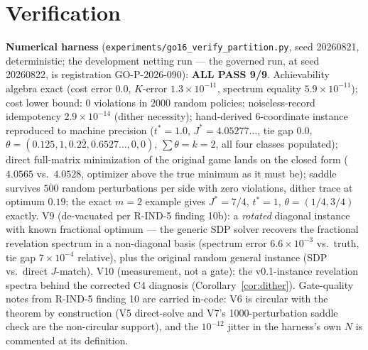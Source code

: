 \documentclass[11pt]{article}
\theoremstyle{definition}
\begin{document}
\section{Verification}

\textbf{Numerical harness}
(\texttt{experiments/go16\_verify\_partition.py}, seed 20260821,
deterministic; the development netting run --- the governed run, at
seed 20260822, is registration GO-P-2026-090): \textbf{ALL PASS 9/9}. Achievability algebra exact (cost
error $0.0$, $K$-error $1.3\times10^{-11}$, spectrum equality
$5.9\times10^{-11}$); cost lower bound: $0$ violations in $2000$
random policies; noiseless-record idempotency $2.9\times10^{-14}$
(dither necessity); hand-derived $6$-coordinate instance reproduced
to machine precision ($t^\ast = 1.0$, $J^\ast = 4.05277\ldots$,
tie gap $0.0$, $\theta = (0.125, 1, 0.2\overline{2}, 0.6527\ldots,
0, 0)$, $\sum\theta = k = 2$, all four classes populated); direct
full-matrix minimization of the original game lands on the closed
form ($4.0565$ vs.\ $4.0528$, optimizer above the true minimum as it
must be); saddle survives $500$ random perturbations per side with
zero violations, dither trace at optimum $0.19$; the exact $m=2$
example gives $J^\ast = 7/4$, $t^\ast = 1$, $\theta = (1/4,3/4)$
exactly. V9 (de-vacuated per R-IND-5 finding 10b): a \emph{rotated}
diagonal instance with known fractional optimum --- the generic SDP
solver recovers the fractional revelation spectrum in a non-diagonal
basis (spectrum error $6.6\times10^{-3}$ vs.\ truth, tie gap
$7\times10^{-4}$ relative), plus the original random general
instance (SDP vs.\ direct $J$-match). V10 (measurement, not a gate):
the v0.1-instance revelation spectra behind the corrected C4
diagnosis (Corollary~\ref{cor:dither}). Gate-quality notes from
R-IND-5 finding 10 are carried in-code: V6 is circular with the
theorem by construction (V5 direct-solve and V7's
1000-perturbation saddle check are the non-circular support), and
the $10^{-12}$ jitter in the harness's own $N$ is commented at its
definition.
\end{document}
